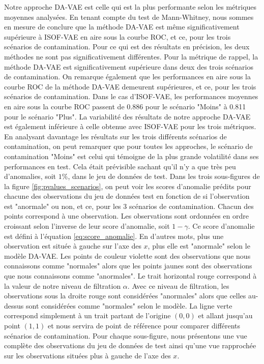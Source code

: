 Notre approche DA-VAE est celle qui est la plus performante selon les métriques moyennes analysées. En tenant compte du test de Mann-Whitney, nous sommes en mesure de conclure que la méthode DA-VAE est même significativement supérieure à ISOF-VAE en aire sous la courbe ROC, et ce, pour les trois scénarios de contamination. Pour ce qui est des résultats en précision, les deux méthodes ne sont pas significativement différentes. Pour la métrique de rappel, la méthode DA-VAE est significativement supérieure dans deux des trois scénarios de contamination. On remarque également  que les performances en aire sous la courbe ROC de la méthode DA-VAE demeurent supérieures, et ce, pour les trois scénarios de contamination. Dans le cas d'ISOF-VAE, les performances moyennes en aire sous la courbe ROC passent de 0.886 pour le scénario "Moins" à 0.811 pour le scénario "Plus". La variabilité des résultats de notre approche DA-VAE est également inférieure à celle obtenue avec ISOF-VAE pour les trois métriques. En analysant davantage les résultats sur les trois différents scénarios de contamination, on peut remarquer que pour toutes les approches, le scénario de contamination "Moins" est celui qui témoigne de la plus grande volatilité dans ses performances en test. Cela était prévisible sachant qu'il n'y a que très peu d'anomalies, soit $1\%$, dans le jeu de données de test. Dans les trois sous-figures de la figure \ref{fig:pvalues_scenarios}, on peut voir les scores d'anomalie prédits pour chacune des observations du jeu de données test en fonction de si l'observation est "anormale" ou non, et ce, pour les 3 scénarios de contamination. Chacun des points correspond à une observation. Les observations sont ordonnées en ordre croissant selon l'inverse de leur score d'anomalie, soit $1-\gamma$. Ce score d'anomalie est défini à l'équation \ref{eq:score_anomalie}. En d'autres mots, plus une observation est située à gauche sur l'axe des $x$, plus elle est "anormale" selon le modèle DA-VAE. Les points de couleur violette sont des observations que nous connaissons comme "normales" alors que les points jaunes sont des observations que nous connaissons comme "anormales". Le trait horizontal rouge correspond à la valeur de notre niveau de filtration $\alpha$. Avec ce niveau de filtration, les observations sous la droite rouge sont considérées "anormales" alors que celles au-dessus sont considérées comme "normales" selon le modèle. La ligne verte correspond simplement à un trait partant de l'origine $(0,0)$ et allant jusqu'au point $(1,1)$ et nous servira de point de référence pour comparer différents scénarios de contamination. Pour chaque sous-figure, nous présentons une vue complète des observations du jeu de données de test ainsi qu'une vue rapprochée sur les observations situées plus à gauche de l'axe des $x$.

